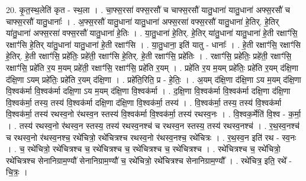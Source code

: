 \documentclass[17pt]{extarticle}
\begin{document}
20. कृ॒त॒स्थ॒लेति॑ कृत - स्थ॒ला । . चा॒फ्स॒रसा॑ वफ्स॒रसौ॑ च चाफ्स॒रसौ॑ यातु॒धाना॑ यातु॒धाना॑ अफ्स॒रसौ॑ च चाफ्स॒रसौ॑ यातु॒धानाः᳚ । . अ॒फ्स॒रसौ॑ यातु॒धाना॑ यातु॒धाना॑ अफ्स॒रसा॑ वफ्स॒रसौ॑ यातु॒धाना॑ हे॒तिर्. हे॒तिर् या॑तु॒धाना॑ अफ्स॒रसा॑ वफ्स॒रसौ॑ यातु॒धाना॑ हे॒तिः । . या॒तु॒धाना॑ हे॒तिर्. हे॒तिर् या॑तु॒धाना॑ यातु॒धाना॑ हे॒ती रक्षाꣳ॑सि॒ रक्षाꣳ॑सि हे॒तिर् या॑तु॒धाना॑ यातु॒धाना॑ हे॒ती रक्षाꣳ॑सि । . या॒तु॒धाना॒ इति॑ यातु - धानाः᳚ । . हे॒ती रक्षाꣳ॑सि॒ रक्षाꣳ॑सि हे॒तिर्. हे॒ती रक्षाꣳ॑सि॒ प्रहे॑तिः॒ प्रहे॑ती॒ रक्षाꣳ॑सि हे॒तिर्. हे॒ती रक्षाꣳ॑सि॒ प्रहे॑तिः । . रक्षाꣳ॑सि॒ प्रहे॑तिः॒ प्रहे॑ती॒ रक्षाꣳ॑सि॒ रक्षाꣳ॑सि॒ प्रहे॑ति र॒य म॒यम् प्रहे॑ती॒ रक्षाꣳ॑सि॒ रक्षाꣳ॑सि॒ प्रहे॑ति र॒यम् । . प्रहे॑ति र॒य म॒यम् प्रहे॑तिः॒ प्रहे॑ति र॒यम् द॑क्षि॒णा द॑क्षि॒णा ऽयम् प्रहे॑तिः॒ प्रहे॑ति र॒यम् द॑क्षि॒णा । . प्रहे॑ति॒रिति॒ प्र - हे॒तिः॒ । . अ॒यम् द॑क्षि॒णा द॑क्षि॒णा ऽय म॒यम् द॑क्षि॒णा वि॒श्वक॑र्मा वि॒श्वक॑र्मा दक्षि॒णा ऽय म॒यम् द॑क्षि॒णा वि॒श्वक॑र्मा । . द॒क्षि॒णा वि॒श्वक॑र्मा वि॒श्वक॑र्मा दक्षि॒णा द॑क्षि॒णा वि॒श्वक॑र्मा॒ तस्य॒ तस्य॑ वि॒श्वक॑र्मा दक्षि॒णा द॑क्षि॒णा वि॒श्वक॑र्मा॒ तस्य॑ । . वि॒श्वक॑र्मा॒ तस्य॒ तस्य॑ वि॒श्वक॑र्मा वि॒श्वक॑र्मा॒ तस्य॑ रथस्व॒नो र॑थस्व॒न स्तस्य॑ वि॒श्वक॑र्मा वि॒श्वक॑र्मा॒ तस्य॑ रथस्व॒नः । . वि॒श्वक॒र्मेति॑ वि॒श्व - क॒र्मा॒ । . तस्य॑ रथस्व॒नो र॑थस्व॒न स्तस्य॒ तस्य॑ रथस्व॒नश्च॑ च रथस्व॒न स्तस्य॒ तस्य॑ रथस्व॒नश्च॑ । . र॒थ॒स्व॒नश्च॑ च रथस्व॒नो र॑थस्व॒नश्च॒ रथे॑चित्रो॒ रथे॑चित्रश्च रथस्व॒नो र॑थस्व॒नश्च॒ रथे॑चित्रः । . र॒थ॒स्व॒न इति॑ रथ - स्व॒नः । . च॒ रथे॑चित्रो॒ रथे॑चित्रश्च च॒ रथे॑चित्रश्च च॒ रथे॑चित्रश्च च॒ रथे॑चित्रश्च । . रथे॑चित्रश्च च॒ रथे॑चित्रो॒ रथे॑चित्रश्च सेनानिग्राम॒ण्यौ॑ सेनानिग्राम॒ण्यौ॑ च॒ रथे॑चित्रो॒ रथे॑चित्रश्च सेनानिग्राम॒ण्यौ᳚ । . रथे॑चित्र॒ इति॒ रथे᳚ - चि॒त्रः॒ । \newline
\end{document}
